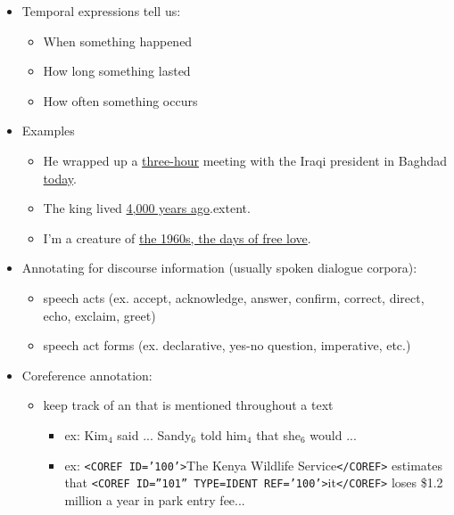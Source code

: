 \documentclass[a4paper,landscape,headrule,footrule,dvips]{foils}
\begin{document}
\begin{CJK}{UTF8}{min}
\begin{itemize}
\item Temporal expressions tell us:
  \begin{itemize}
  \item When something happened
  \item How long something lasted
  \item How often something occurs
  \end{itemize}
\item Examples
  \begin{itemize}
  \item  He wrapped up a \ul{three-hour} meeting with the Iraqi president in
    Baghdad \ul{today}.
  \item The king lived \ul{4,000 years ago}.extent.
  \item I’m a creature of \ul{the 1960s, the days of free love}.
  \end{itemize}
\end{itemize}


\begin{itemize}
\item  Annotating for discourse information (usually spoken
  dialogue corpora):
  \begin{itemize}
  \item  speech acts (ex. accept, acknowledge, answer, confirm, correct, direct,
    echo, exclaim, greet)
  \item  speech act forms (ex. declarative, yes-no question, imperative, etc.)
  \end{itemize}
\item  Coreference annotation:
  \begin{itemize}
  \item  keep track of an  that is mentioned throughout a text
    \begin{itemize}
    \item  ex: Kim$_4$ said ... Sandy$_6$ told him$_4$ that she$_6$ would ...
    \item  ex: \texttt{<COREF ID='100'>}The Kenya Wildlife Service\texttt{</COREF>} estimates
      that \texttt{<COREF ID=”101” TYPE=IDENT REF='100'>}it\texttt{</COREF>} loses \$1.2
      million a year in park entry fee...
    \end{itemize}
  \end{itemize}
\end{itemize}


\end{CJK}
\end{document}
